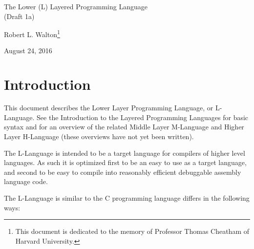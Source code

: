 \documentclass[12pt]{article}
\makeatletter
\renewcommand\tableofcontents{%
    \begin{list}{}%
	     {\setlength{\itemsep}{0in}%
	      \setlength{\topsep}{0in}%
	      \setlength{\parsep}{1ex}%
	      \setlength{\labelwidth}{0in}%
	      \setlength{\baselineskip}{1.5ex}%
	      \setlength{\leftmargin}{1.0in}%
	      \setlength{\rightmargin}{1.0in}}%
    \item\@starttoc{toc}%
    \end{list}}
\makeatother
\begin{document}
        
\begin{center}

{\Large
The Lower (L) Layered Programming Language \\[0.5ex]
(Draft 1a)}

\medskip

Robert L. Walton\footnote{This document is dedicated to the memory
of Professor Thomas Cheatham of Harvard University.}

August 24, 2016
 
\end{center}

{\small \tableofcontents}

\newpage

\section{Introduction}

This document describes the Lower Layer Programming Language, or
L-Language.  See the Introduction to the Layered
Programming Languages for basic syntax and for an overview of the related
Middle Layer M-Language and Higher Layer H-Language (these overviews
have not yet been written).

The L-Language is intended to be a target language for compilers of
higher level languages.  As such it is optimized first to be an easy to 
use as a target language, and second to be easy to
compile into reasonably efficient debuggable assembly language code.

The L-Language is similar to the C programming language
differs in the following ways:
\end{document}
